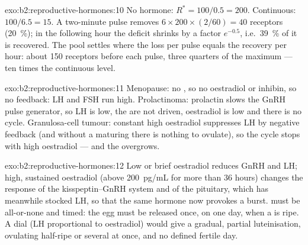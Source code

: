 \begin{solution}{exo:b2:reproductive-hormones:10}
No hormone: $R^* = 100/0.5 = 200$. Continuous: $100/6.5 = 15$. A
two-minute pulse removes $6\times 200\times(2/60) = 40$ receptors
(\qty{20}{\%}); in the following hour the deficit shrinks by a
factor $e^{-0.5}$, i.e.\ \qty{39}{\%} of it is recovered. The pool
settles where the loss per pulse equals the recovery per hour:
about 150 receptors before each pulse, three quarters of the
maximum --- ten times the continuous level.
\end{solution}

\begin{solution}{exo:b2:reproductive-hormones:11}
Menopause: no , so no oestradiol or inhibin, so no
feedback: LH and FSH run high. Prolactinoma: prolactin slows the
GnRH pulse generator, so LH is low, the  are not driven,
oestradiol is low and there is no cycle. Granulosa-cell tumour:
constant high oestradiol suppresses LH by negative feedback (and
without a maturing  there is nothing to ovulate), so the
cycle stops with high oestradiol --- and the  overgrows.
\end{solution}

\begin{solution}{exo:b2:reproductive-hormones:12}
Low or brief oestradiol reduces GnRH and LH; high, sustained
oestradiol (above \qty{200}{pg/mL} for more than 36 hours) changes
the response of the kisspeptin--GnRH system and of the pituitary,
which has meanwhile stocked LH, so that the same hormone now
provokes a burst.  must be all-or-none and timed: the egg
must be released once, on one day, when a  is ripe. A dial
(LH proportional to oestradiol) would give a gradual, partial
luteinisation,  ovulating half-ripe or several at once,
and no defined fertile day.
\end{solution}

